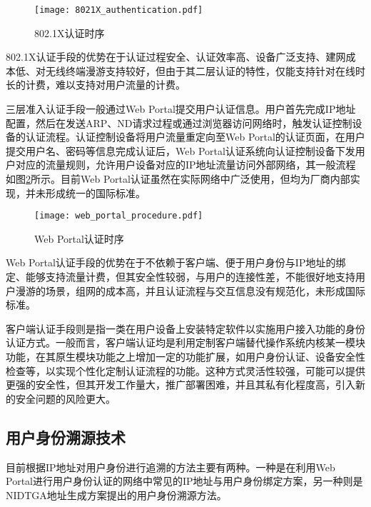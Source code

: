         \begin{figure}[ht]
          \centering
          \texttt{[image: 8021X\_authentication.pdf]}
          \caption{802.1X认证时序}
          \label{fig:802.1X_authentication}
        \end{figure}
        
      802.1X认证手段的优势在于认证过程安全、认证效率高、设备广泛支持、建网成本低、对无线终端漫游支持较好，但由于其二层认证的特性，仅能支持针对在线时长的计费，难以支持对用户流量的计费。
      
      三层准入认证手段一般通过Web Portal提交用户认证信息。用户首先完成IP地址配置，然后在发送ARP、ND请求过程或通过浏览器访问网络时，触发认证控制设备的认证流程。认证控制设备将用户流量重定向至Web Portal的认证页面，在用户提交用户名、密码等信息完成认证后，Web Portal认证系统向认证控制设备下发用户对应的流量规则，允许用户设备对应的IP地址流量访问外部网络，其一般流程如图\ref{fig:web_portal_procedure}所示。目前Web Portal认证虽然在实际网络中广泛使用，但均为厂商内部实现，并未形成统一的国际标准。
      
      \begin{figure}[ht]
        \centering
        \texttt{[image: web\_portal\_procedure.pdf]}
        \caption{Web Portal认证时序}
        \label{fig:web_portal_procedure}
      \end{figure}
      
      Web Portal认证手段的优势在于不依赖于客户端、便于用户身份与IP地址的绑定、能够支持流量计费，但其安全性较弱，与用户的连接性差，不能很好地支持用户漫游的场景，组网的成本高，并且认证流程与交互信息没有规范化，未形成国际标准。
      
      客户端认证手段则是指一类在用户设备上安装特定软件以实施用户接入功能的身份认证方式。一般而言，客户端认证均是利用定制客户端替代操作系统内核某一模块功能，在其原生模块功能之上增加一定的功能扩展，如用户身份认证、设备安全性检查等，以实现个性化定制认证流程的功能。这种方式灵活性较强，可能可以提供更强的安全性，但其开发工作量大，推广部署困难，并且其私有化程度高，引入新的安全问题的风险更大。
  
      \subsection{用户身份溯源技术}
      \label{survey:identity:trace}
      目前根据IP地址对用户身份进行追溯的方法主要有两种。一种是在利用Web Portal进行用户身份认证的网络中常见的IP地址与用户身份绑定方案，另一种则是NIDTGA地址生成方案提出的用户身份溯源方法。
    
